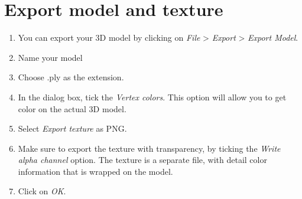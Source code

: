 \documentclass[
]{book}
\begin{document}
\hypertarget{export-model-and-texture}{%
\section{Export model and texture}\label{export-model-and-texture}}

\begin{enumerate}
\def\labelenumi{\arabic{enumi}.}
\item
  You can export your 3D model by clicking on \emph{File} \textgreater{} \emph{Export} \textgreater{}
  \emph{Export Model}.
\item
  Name your model
\item
  Choose .ply as the extension.
\item
  In the dialog box, tick the \emph{Vertex colors}. This option will allow
  you to get color on the actual 3D model.
\item
  Select \emph{Export texture} as PNG.
\item
  Make sure to export the texture with transparency, by ticking the
  \emph{Write alpha channel} option. The texture is a separate file, with
  detail color information that is wrapped on the model.
\item
  Click on \emph{OK}.
\end{enumerate}

  
\end{document}
